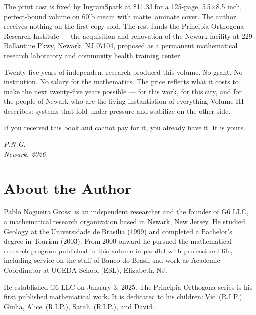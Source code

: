 \documentclass[12pt, oneside]{book}
\theoremstyle{plain}
\theoremstyle{definition}
\theoremstyle{remark}
\begin{document}
\noindent The print cost is fixed by IngramSpark at \$11.33 for
a 125-page, 5.5$\times$8.5 inch, perfect-bound volume on 60lb cream
with matte laminate cover. The author receives nothing on the
first copy sold. The rest funds the
Principia Orthogona Research Institute ---
the acquisition and renovation of the Newark facility at
229 Ballantine Pkwy, Newark, NJ 07104,
proposed as a permanent mathematical research laboratory
and community health training center.

\vspace{0.4cm}

\noindent Twenty-five years of independent research produced this volume.
No grant. No institution. No salary for the mathematics.
The price reflects what it costs to make the next twenty-five
years possible --- for this work, for this city, and for
the people of Newark who are the living instantiation
of everything Volume III describes:
systems that fold under pressure and stabilize on the other side.

\vspace{0.4cm}

\noindent If you received this book and cannot pay for it,
you already have it. It is yours.

\vspace{1.2cm}

\begin{flushright}
\textit{P.N.G.}\\[0.2em]
\textit{Newark, 2026}
\end{flushright}

\newpage
\chapter*{About the Author}

Pablo Nogueira Grossi is an independent researcher and the founder of G6 LLC,
a mathematical research organization based in Newark, New Jersey. He studied
Geology at the Universidade de Bras\'ilia (1999) and completed a Bachelor's
degree in Tourism (2003). From 2000 onward he pursued the mathematical research
program published in this volume in parallel with professional life, including
service on the staff of Banco do Brasil and work as Academic Coordinator at
UCEDA School (ESL), Elizabeth, NJ.

He established G6 LLC on January 3, 2025. The Principia Orthogona series is
his first published mathematical work. It is dedicated to his children:
Vic~(R.I.P.), Giulia, Alice~(R.I.P.), Sarah~(R.I.P.), and David.
\end{document}
